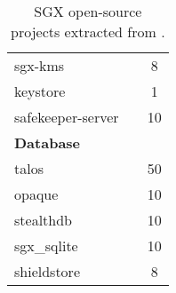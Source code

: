 \begin{table}[t]
\begin{tabular}{lcc}
		\midrule
		sgx-kms & \checkmark & 8 \\
		keystore & \checkmark & 1 \\
		safekeeper-server & \checkmark & 10 \\ \midrule
		\multicolumn{3}{l}{\textbf{Database}} \\ \midrule
		talos & \checkmark & 50 \\
		opaque & \checkmark & 10 \\
		stealthdb & \checkmark & 10 \\
		sgx\_sqlite & \checkmark & 10 \\
		shieldstore & \checkmark & 8 \\
		\bottomrule		
	\end{tabular}
	\caption[List of SGX open-source projects.]{SGX open-source projects 
	extracted from \cite{asop}.}
	\label{tbl:sgx-open-source-prj}
\end{table}